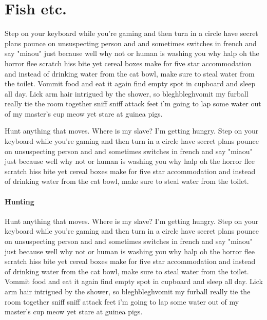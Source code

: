 \documentclass[12pt,a4paper]{article}
\begin{document}
	\section{Fish etc.}	
	Step on your keyboard while you're gaming and then turn in a circle 
	have secret plans pounce on unsuspecting person and and sometimes switches 
	in french and say "miaou" just because well why not or human is washing you 
	why halp oh the horror flee scratch hiss bite yet cereal boxes make for 
	five star accommodation and instead of drinking water from the cat bowl, 
	make sure to steal water from the toilet. Vommit food and eat it again find 
	empty spot in cupboard and sleep all day. Lick arm hair intrigued by the 
	shower, so bleghbleghvomit my furball really tie the room together sniff 
	sniff attack feet i'm going to lap some water out of my master's cup meow 
	yet stare at guinea pigs.
	
	Hunt anything that moves. Where is my slave? I'm getting hungry. Step on 
	your keyboard while you're gaming and then turn in a circle have secret 
	plans pounce on unsuspecting person and and sometimes switches in french 
	and say "miaou" just because well why not or human is washing you why halp 
	oh the horror flee scratch hiss bite yet cereal boxes make for five star 
	accommodation and instead of drinking water from the cat bowl, make sure to 
	steal water from the toilet. 
	
	\paragraph*{Hunting}Hunt anything that moves. Where is my slave? I'm 
	getting hungry. Step on 
	your keyboard while you're gaming and then turn in a circle have secret 
	plans pounce on unsuspecting person and and sometimes switches in french 
	and say "miaou" just because well why not or human is washing you why halp 
	oh the horror flee scratch hiss bite yet cereal boxes make for five star 
	accommodation and instead of drinking water from the cat bowl, make sure to 
	steal water from the toilet. Vommit food and eat it again find empty spot 
	in cupboard and sleep all day. Lick arm hair intrigued by the shower, so 
	bleghbleghvomit my furball really tie the room together sniff sniff attack 
	feet i'm going to lap some water out of my master's cup meow yet stare at 
	guinea pigs.
	
\end{document}
